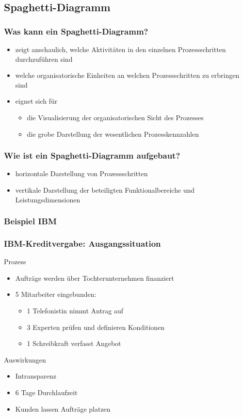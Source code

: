 \documentclass[xcolor=dvipsnames]{beamer}
\begin{document}
 \subsection[Spaghetti-Diagramm]{Spaghetti-Diagramm}
 \begin{frame}
  \frametitle{Was kann ein Spaghetti-Diagramm?  }
   
  \begin{itemize}
  \item zeigt anschaulich, welche Aktivitäten in den einzelnen Prozessschritten durchzuführen sind
  \item welche organisatorische Einheiten an welchen Prozessschritten zu erbringen sind
  \item eignet sich für 
  \begin{itemize}
  	\item die Visualisierung der organisatorischen Sicht des Prozesses
  	\item die grobe Darstellung der wesentlichen Prozesskennzahlen 
  \end{itemize}
  \end{itemize}
  
   \end{frame}

\begin{frame}
  \frametitle{Wie ist ein Spaghetti-Diagramm aufgebaut?}
  
  \begin{itemize}
  \item horizontale Darstellung von Prozessschritten
  \item vertikale Darstellung der beteiligten Funktionalbereiche und Leistungsdimensionen
  \end{itemize}

 \end{frame}


 \subsubsection[Beispiel IBM]{Beispiel IBM}
 \begin{frame}
  \frametitle{IBM-Kreditvergabe: Ausgangssituation}
  Prozess
  \begin{itemize}
    \item Aufträge werden über Tochterunternehmen finanziert
    \item 5 Mitarbeiter eingebunden:
    \begin{itemize}
      \item 1 Telefonistin nimmt Antrag auf
      \item 3 Experten prüfen und definieren Konditionen
      \item 1 Schreibkraft verfasst Angebot
    \end{itemize}
  \end{itemize}
  Auswirkungen
  \begin{itemize}
    \item Intransparenz
    \item 6 Tage Durchlaufzeit
    \item Kunden lassen Aufträge platzen
  \end{itemize}
 \end{frame}
\end{document}
